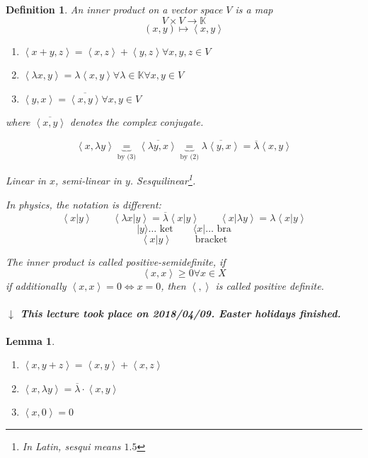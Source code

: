 \documentclass{article}
\newtheorem{definition}{Definition}  \numberwithin{definition}{section}
\newtheorem{lemma}{Lemma}  \numberwithin{lemma}{section}
\newcommand{\angel}[1]{\left\langle#1\right\rangle}
\newcommand{\dateref}[1]{%
  \begin{mdframed}[backgroundcolor=gray!10,innerbottommargin=0pt,innertopmargin=0pt]
    \paragraph{\textit{$\downarrow$ This lecture took place on #1.}}%
  \end{mdframed}%
}
\begin{document}
\begin{definition} %
  An inner product on a vector space $V$ is a map
  \[ V \times V \to \mathbb K \]
  \[ (x,y) \mapsto \angel{x,y} \]
  \begin{enumerate}
    \item $\angel{x+y, z} = \angel{x,z} + \angel{y,z} \forall x,y,z \in V$
    \item $\angel{\lambda x, y} = \lambda \angel{x,y} \forall \lambda \in \mathbb K \forall x,y \in V$
    \item $\angel{y,x} = \overline{\angel{x,y}} \forall x,y \in V$
  \end{enumerate}
  where $\overline{\angel{x,y}}$ denotes the complex conjugate.

  \[
    \angel{x, \lambda y} \underbrace{=}_{\text{by (3)}} \overline{\angel{\lambda y, x}}
      \underbrace{=}_{\text{by (2)}} \overline{\lambda \angel{y, x}}
      = \overline{\lambda} \angel{x,y}
  \]

  Linear in $x$, semi-linear in $y$. Sesquilinear\footnote{In Latin, sesqui means $1.5$}.

  In physics, the notation is different:
  \[ \angel{x|y} \qquad \angel{\lambda x|y} = \overline{\lambda} \angel{x|y} \qquad \angel{x|\lambda y} = \lambda \angel{x|y} \]
  \[ |y\rangle \dots \text{ ket} \qquad \langle x| \dots \text{ bra} \]
  \[ \angel{x|y} \qquad \text{ bracket} \]

  The inner product is called positive-semidefinite, if
  \[ \angel{x,x} \geq 0 \forall x \in X \]
  if additionally $\angel{x,x} = 0 \iff x = 0$, then $\angel{,}$ is called positive definite.
\end{definition}

\dateref{2018/04/09. Easter holidays finished}

\begin{lemma} %
  \begin{enumerate}
    \item $\angel{x, y + z} = \angel{x, y} + \angel{x, z}$
    \item $\angel{x, \lambda y} = \overline{\lambda} \cdot \angel{x, y}$
    \item $\angel{x, 0} = 0$
  \end{enumerate}
\end{lemma}
\end{document}
